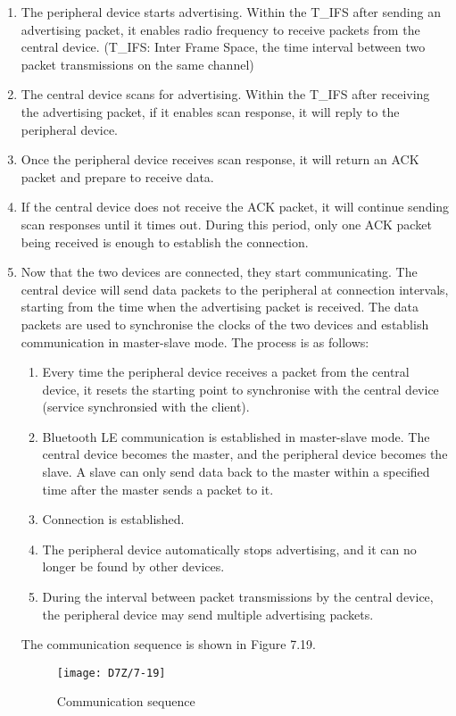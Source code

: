 \documentclass[a4paper,12pt]{book}
\begin{document}
\begin{enumerate}[label=(\arabic*)]
    \item The peripheral device starts advertising. Within the T\_IFS after sending an advertising packet, it enables radio frequency to receive packets from the central device. (T\_IFS: Inter Frame Space, the time interval between two packet transmissions on the same channel)
    \item The central device scans for advertising. Within the T\_IFS after receiving the advertising packet, if it enables scan response, it will reply to the peripheral device.
    \item Once the peripheral device receives scan response, it will return an ACK packet and prepare to receive data.
    \item If the central device does not receive the ACK packet, it will continue sending scan responses until it times out. During this period, only one ACK packet being received is enough to establish the connection.
    \item Now that the two devices are connected, they start communicating. The central device will send data packets to the peripheral at connection intervals, starting from the time when the advertising packet is received. The data packets are used to synchronise the clocks of the two devices and establish communication in master-slave mode. The process is as follows:

    \begin{enumerate}[label=\alph*., leftmargin=1.5em]
        \item Every time the peripheral device receives a packet from the central device, it resets the starting point to synchronise with the central device (service synchronsied with the client).
        \item Bluetooth LE communication is established in master-slave mode. The central device becomes the master, and the peripheral device becomes the slave. A slave can only send data back to the master within a specified time after the master sends a packet to it.
        \item Connection is established.
        \item The peripheral device automatically stops advertising, and it can no longer be found by other devices.
        \item During the interval between packet transmissions by the central device, the peripheral device may send multiple advertising packets.
    \end{enumerate}

    The communication sequence is shown in Figure 7.19.

    \begin{figure}[!h]
        \centering
        \texttt{[image: D7Z/7-19]}
        \caption{Communication sequence}
    \end{figure}
\end{enumerate}
\end{document}
